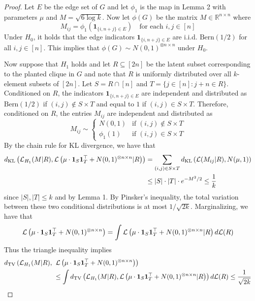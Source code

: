 \documentclass[11pt]{article}
\begin{document}
\begin{proof}
Let $E$ be the edge set of $G$ and let $\phi_1$ is the map in Lemma 2 with parameters $\mu$ and $M = \sqrt{6 \log k}$. Now let $\phi(G)$ be the matrix $M \in \mathbb{R}^{n \times n}$ where
$$M_{ij} = \phi_1( \mathbf{1}_{\{ i, n + j \} \in E} ) \quad \text{for each } i, j \in [n]$$
Under $H_0$, it holds that the edge indicators $\mathbf{1}_{\{ i, n + j \} \in E}$ are i.i.d. $\text{Bern}(1/2)$ for all $i, j \in [n]$. This implies that $\phi(G) \sim N(0, 1)^{\otimes n \times n}$ under $H_0$.

Now suppose that $H_1$ holds and let $R \subseteq [2n]$ be the latent subset corresponding to the planted clique in $G$ and note that $R$ is uniformly distributed over all $k$-element subsets of $[2n]$. Let $S = R \cap [n]$ and $T = \{ j \in [n] : j + n \in R \}$. Conditioned on $R$, the indicators $\mathbf{1}_{\{ i, n + j \} \in E}$ are independent and distributed as $\text{Bern}(1/2)$ if $(i, j) \not \in S \times T$ and equal to $1$ if $(i, j) \in S \times T$. Therefore, conditioned on $R$, the entries $M_{ij}$ are independent and distributed as
$$M_{ij} \sim \left\{ \begin{matrix} N(0, 1) &\text{if } (i, j) \not \in S \times T \\ \phi_1(1) &\text{if } (i, j) \in S \times T \end{matrix} \right.$$
By the chain rule for KL divergence, we have that
\begin{align*}
d_{\text{KL}}\left( \mathcal{L}_{H_1}(M | R), \mathcal{L}\left( \mu \cdot \mathbf{1}_S \mathbf{1}_T^\top + N(0, 1)^{\otimes n \times n} | R \right) \right) &= \sum_{(i, j) \in S \times T} d_{\text{KL}}\left( \mathcal{L}(M_{ij} | R), N(\mu, 1) \right) \\
&\le |S| \cdot |T| \cdot e^{-M^2/2} \le \frac{1}{k}
\end{align*}
since $|S|, |T| \le k$ and by Lemma 1. By Pinsker's inequality, the total variation between these two conditional distributions is at most $1/\sqrt{2k}$. Marginalizing, we have that
$$\mathcal{L}\left( \mu \cdot \mathbf{1}_S \mathbf{1}_T^\top + N(0, 1)^{\otimes n \times n} \right) = \int \mathcal{L}\left( \mu \cdot \mathbf{1}_S \mathbf{1}_T^\top + N(0, 1)^{\otimes n \times n} | R \right) d\mathcal{L}(R)$$
Thus the triangle inequality implies
\begin{align*}
\TV\left( \mL_{H_1}(M | R), \right. &\left. \mL\left( \mu \cdot \mathbf{1}_S \mathbf{1}_T^\top + N(0, 1)^{\otimes n \times n} \right) \right) \\
&\le \int \TV\left( \mL_{H_1}(M | R), \mL\left( \mu \cdot \mathbf{1}_S \mathbf{1}_T^\top + N(0, 1)^{\otimes n \times n} | R \right) \right)d\mL(R) \le \frac{1}{\sqrt{2k}}

\end{align*}
\end{proof}
\end{document}
